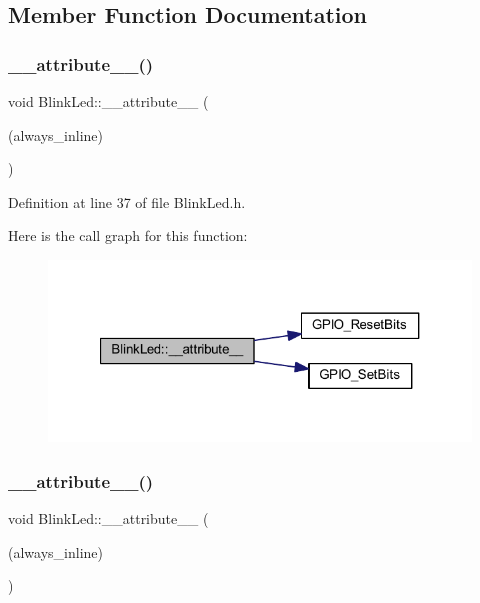 \subsection{Member Function Documentation}
\mbox{\label{class_blink_led_ae5768d48c161e9150c97e19c369b64de}} 
\subsubsection{\texorpdfstring{\+\_\+\+\_\+attribute\+\_\+\+\_\+()}{\_\_attribute\_\_()}\hspace{0.1cm}{\footnotesize\ttfamily [1/2]}}
{\footnotesize\ttfamily void Blink\+Led\+::\+\_\+\+\_\+attribute\+\_\+\+\_\+ (\begin{DoxyParamCaption}\item[{(always\+\_\+inline)}]{ }\end{DoxyParamCaption})\hspace{0.3cm}{\ttfamily [inline]}}



Definition at line 37 of file Blink\+Led.\+h.

Here is the call graph for this function\+:
\nopagebreak
\begin{figure}[H]
\begin{center}
\leavevmode
\includegraphics[width=321pt]{class_blink_led_ae5768d48c161e9150c97e19c369b64de_cgraph}
\end{center}
\end{figure}
\mbox{\label{class_blink_led_a9f8f662f733e131e6477161ac785f665}} 
\subsubsection{\texorpdfstring{\+\_\+\+\_\+attribute\+\_\+\+\_\+()}{\_\_attribute\_\_()}\hspace{0.1cm}{\footnotesize\ttfamily [2/2]}}
{\footnotesize\ttfamily void Blink\+Led\+::\+\_\+\+\_\+attribute\+\_\+\+\_\+ (\begin{DoxyParamCaption}\item[{(always\+\_\+inline)}]{ }\end{DoxyParamCaption})\hspace{0.3cm}{\ttfamily [inline]}}



